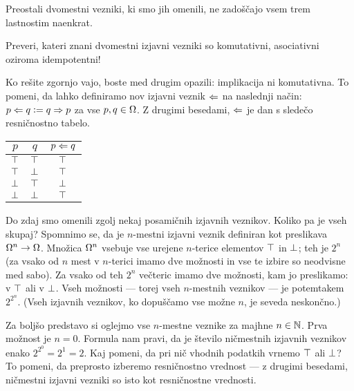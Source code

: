                 Preostali dvomestni vezniki, ki smo jih omenili, ne zadoščajo vsem trem lastnostim naenkrat.

                \begin{naloga}
                        Preveri, kateri znani dvomestni izjavni vezniki so komutativni, asociativni oziroma idempotentni!
                \end{naloga}

                Ko rešite zgornjo vajo, boste med drugim opazili: implikacija ni komutativna. To pomeni, da lahko definiramo nov izjavni veznik $\Leftarrow$ na naslednji način: $p \Leftarrow q \mathrel{\mathop:}= q \Rightarrow p$ za vse $p, q \in \Omega$. Z drugimi besedami, $\Leftarrow$ je dan s sledečo resničnostno tabelo.
                \begin{center}
                        \begin{tabular}{cc|c}
                                $p$ & $q$ & $p \Leftarrow q$ \\
                                \hline
                                $\top$ & $\top$ & $\top$ \\
                                $\top$ & $\bot$ & $\top$ \\
                                $\bot$ & $\top$ & $\bot$ \\
                                $\bot$ & $\bot$ & $\top$
                        \end{tabular}
                \end{center}


                Do zdaj smo omenili zgolj nekaj posamičnih izjavnih veznikov. Koliko pa je vseh skupaj? Spomnimo se, da je $n$-mestni izjavni veznik definiran kot preslikava $\Omega^n \to \Omega$. Množica $\Omega^n$ vsebuje vse urejene $n$-terice elementov $\top$ in $\bot$; teh je $2^n$ (za vsako od $n$ mest v $n$-terici imamo dve možnosti in vse te izbire so neodvisne med sabo). Za vsako od teh $2^n$ večteric imamo dve možnosti, kam jo preslikamo: v $\top$ ali v $\bot$. Vseh možnosti --- torej vseh $n$-mestnih veznikov --- je potemtakem $2^{2^n}$. (Vseh izjavnih veznikov, ko dopuščamo vse možne $n$, je seveda neskončno.)

                Za boljšo predstavo si oglejmo vse $n$-mestne veznike za majhne $n \in \mathbb{N}$. Prva možnost je $n = 0$. Formula nam pravi, da je število ničmestnih izjavnih veznikov enako $2^{2^0} = 2^1 = 2$. Kaj pomeni, da pri nič vhodnih podatkih vrnemo $\top$ ali $\bot$? To pomeni, da preprosto izberemo resničnostno vrednost --- z drugimi besedami, ničmestni izjavni vezniki so isto kot resničnostne vrednosti.

